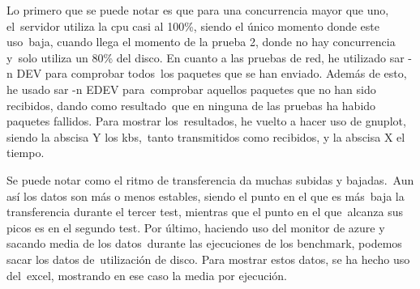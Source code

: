 \documentclass[11pt,twoside,a4paper]{book}
\begin{document}
%
Lo primero que se puede notar es que para una concurrencia mayor que uno, el\
servidor utiliza la cpu casi al 100\%, siendo el único momento donde este uso\
baja, cuando llega el momento de la prueba 2, donde no hay concurrencia y\
solo utiliza un 80\% del disco. \newline
En cuanto a las pruebas de red, he utilizado sar -n DEV para comprobar todos\
los paquetes que se han enviado. Además de esto, he usado sar -n EDEV para\
comprobar aquellos paquetes que no han sido recibidos, dando como resultado\
que en ninguna de las pruebas ha habido paquetes fallidos. Para mostrar los\
resultados, he vuelto a hacer uso de gnuplot, siendo la abscisa Y los kbs,\
tanto transmitidos como recibidos, y la abscisa X el tiempo.

%
Se puede notar como el ritmo de transferencia da muchas subidas y bajadas.\
Aun así los datos son más o menos estables, siendo el punto en el que es más\
baja la transferencia durante el tercer test, mientras que el punto en el que\
alcanza sus picos es en el segundo test. \newline
Por último, haciendo uso del monitor de azure y sacando media de los datos\
durante las ejecuciones de los benchmark, podemos sacar los datos de\
utilización de disco. Para mostrar estos datos, se ha hecho uso del\
excel, mostrando en ese caso la media por ejecución.
\end{document}
